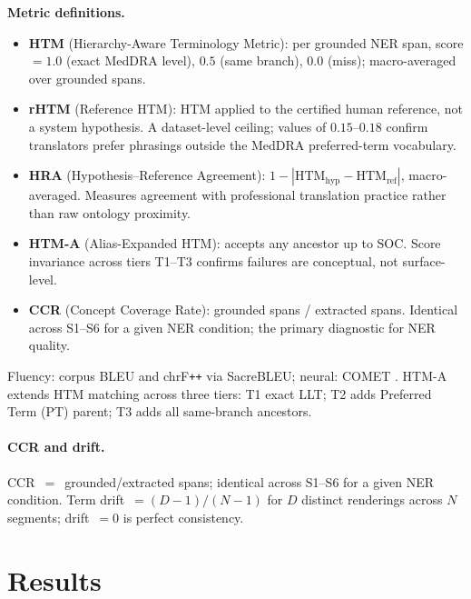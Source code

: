 \documentclass[11pt,a4paper,twocolumn]{article}
\begin{document}
\begin{metricbox}
\noindent\textbf{Metric definitions.}
\begin{itemize}[noitemsep, topsep=3pt, leftmargin=*]
  \item \textbf{HTM} (Hierarchy-Aware Terminology Metric): per grounded
  NER span, score $= 1.0$ (exact MedDRA level), $0.5$ (same branch),
  $0.0$ (miss); macro-averaged over grounded spans.
  \item \textbf{rHTM} (Reference HTM): HTM applied to the certified human
  reference, not a system hypothesis. A dataset-level ceiling;
  values of $0.15$--$0.18$ confirm translators prefer phrasings outside
  the MedDRA preferred-term vocabulary.
  \item \textbf{HRA} (Hypothesis--Reference Agreement):
  $1 - |\mathrm{HTM}_\mathrm{hyp} - \mathrm{HTM}_\mathrm{ref}|$,
  macro-averaged. Measures agreement with professional
  translation practice rather than raw ontology proximity.
  \item \textbf{HTM-A} (Alias-Expanded HTM): accepts any ancestor up to
  SOC. Score invariance across tiers T1--T3 confirms failures are
  conceptual, not surface-level.
  \item \textbf{CCR} (Concept Coverage Rate): grounded spans / extracted
  spans. Identical across S1--S6 for a given NER condition; the primary
  diagnostic for NER quality.
\end{itemize}
\end{metricbox}

\noindent Fluency: corpus BLEU \citep{papineni2002bleu} and chrF\texttt{++}
\citep{popovic2017chrf} via SacreBLEU; neural: COMET \citep{rei2020comet}.
HTM-A extends HTM matching across three tiers: T1 exact LLT; T2 adds Preferred
Term (PT) parent; T3 adds all same-branch ancestors.

\paragraph{CCR and drift.}
CCR~$=$~grounded/extracted spans; identical across S1--S6 for a given NER
condition. Term drift~$= (D-1)/(N-1)$ for $D$ distinct renderings across
$N$ segments; drift~$=0$ is perfect consistency.

\section{Results}
\label{sec:results}
\end{document}

